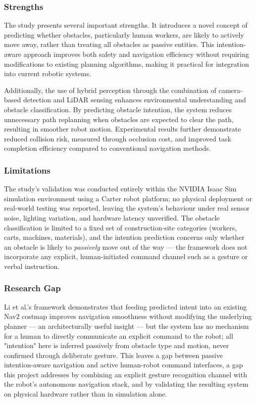 \subsubsection{Strengths}

The study presents several important strengths. It introduces a novel concept of predicting whether obstacles, particularly human workers, are likely to actively move away, rather than treating all obstacles as passive entities. This intention-aware approach improves both safety and navigation efficiency without requiring modifications to existing planning algorithms, making it practical for integration into current robotic systems.

Additionally, the use of hybrid perception through the combination of camera-based detection and LiDAR sensing enhances environmental understanding and obstacle classification. By predicting obstacle intention, the system reduces unnecessary path replanning when obstacles are expected to clear the path, resulting in smoother robot motion. Experimental results further demonstrate reduced collision risk, measured through occlusion cost, and improved task completion efficiency compared to conventional navigation methods.

\subsubsection{Limitations}

The study's validation was conducted entirely within the NVIDIA Isaac Sim simulation
environment using a Carter robot platform; no physical deployment or real-world testing
was reported, leaving the system's behaviour under real sensor noise, lighting
variation, and hardware latency unverified. The obstacle classification is limited to a
fixed set of construction-site categories (workers, carts, machines, materials), and
the intention prediction concerns only whether an obstacle is likely to \textit{passively}
move out of the way — the framework does not incorporate any explicit, human-initiated
command channel such as a gesture or verbal instruction.

\subsubsection{Research Gap}

Li et al.'s framework demonstrates that feeding predicted intent into an existing Nav2
costmap improves navigation smoothness without modifying the underlying planner — an
architecturally useful insight — but the system has no mechanism for a human to
directly communicate an explicit command to the robot; all "intention" here is inferred
passively from obstacle type and motion, never confirmed through deliberate gesture.
This leaves a gap between passive intention-aware navigation and active human-robot
command interfaces, a gap this project addresses by combining an explicit gesture
recognition channel with the robot's autonomous navigation stack, and by validating the
resulting system on physical hardware rather than in simulation alone.

